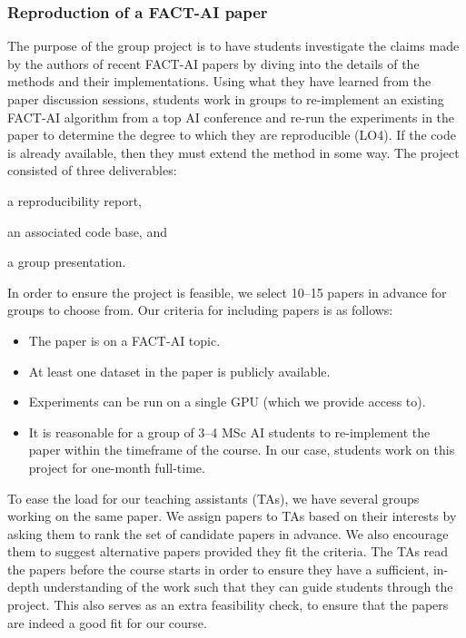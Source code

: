 \subsubsection{Reproduction of a FACT-AI paper}
The purpose of the group project is to have students investigate the claims made by the authors of recent FACT-AI papers by diving into the details of the methods and their implementations.  
Using what they have learned from the paper discussion sessions, students work in groups to re-implement an existing FACT-AI algorithm from a top AI conference and re-run the experiments in the paper to determine the degree to which they are reproducible (LO4). 
If the code is already available, then they must extend the method in some way. 
The project consisted of three deliverables: 
\begin{enumerate*}[label=(\roman*)]
\item a reproducibility report, 
\item an associated code base, and 
\item a group presentation. 
\end{enumerate*}
%
In order to ensure the project is feasible, we select 10--15 papers in advance for groups to choose from. 
Our criteria for including papers is as follows:
\begin{itemize}
    \item The paper is on a FACT-AI topic. 
    \item At least one dataset in the paper is publicly available.
    \item Experiments can be run on a single GPU (which we provide access to).
    \item It is reasonable for a group of 3--4 MSc AI students to re-implement the paper within the timeframe of the course. In our case, students work on this project for one-month full-time. 
\end{itemize}

\noindent%
To ease the load for our teaching assistants (TAs), we have several groups working on the same paper. 
We assign papers to TAs based on their interests by asking them to rank the set of candidate papers in advance. 
We also encourage them to suggest alternative papers provided they fit the criteria. 
The TAs read the papers before the course starts in order to ensure they have a sufficient, in-depth understanding of the work such that they can guide students through the project. 
This also serves as an extra feasibility check, to ensure that the papers are indeed a good fit for our course.

